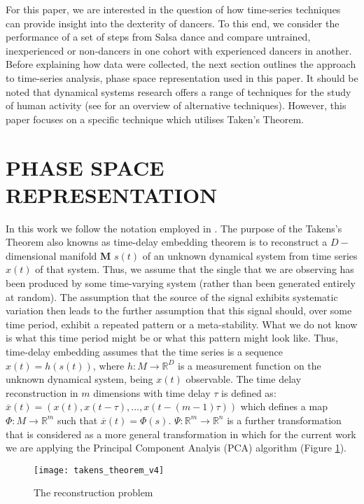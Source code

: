\documentclass{sigchi}
\begin{document}
For this paper, we are interested in the question of how time-series techniques can provide insight into 
the dexterity of dancers. To this end, we consider the performance of a set of steps from Salsa dance and 
compare untrained, inexperienced or non-dancers in one cohort with experienced dancers in another. 
Before explaining how data were collected, the next section outlines the approach to time-series analysis,
phase space representation used in this paper. 
It should be noted that dynamical systems research offers a range of techniques for the study of human activity 
(see \cite{Guastello2011} for an overview of alternative techniques). 
However, this paper focuses on a specific technique which utilises Taken's Theorem.






\section{PHASE SPACE REPRESENTATION}
In this work we follow the notation employed in \cite{Uzal2011}.
The purpose of the Takens's Theorem also knowns as time-delay embedding theorem 
is to reconstruct a $D-$dimensional manifold \textbf{M} $s(t)$ of an unknown dynamical 
system from time series $x(t)$ of that system.
Thus, we assume that the single that we are observing has been produced by some time-varying system 
(rather than been generated entirely at random).  
The assumption that the source of the signal exhibits systematic variation then leads to the further 
assumption that this signal should, over some time period, exhibit a repeated pattern or a meta-stability.  
What we do not know is what this time period might be or what this pattern might look like.  
Thus, time-delay embedding assumes that the time series is a sequence $x(t)=h(s(t))$, 
where $h: M \rightarrow \mathbb{R}^D$ is a measurement function on the unknown dynamical system, 
being $x(t)$ observable.
The time delay reconstruction in $m$ dimensions with time delay $\tau$ is defined as:
$\overline{x}(t) = (x(t), x(t-\tau),...,x(t-(m-1)\tau))$ which defines a map
$\varPhi: M \rightarrow \mathbb{R}^m$ such that $\overline{x}(t) = \varPhi(s)$.
$\varPsi: \mathbb{R}^m \rightarrow \mathbb{R}^n$ is a further transformation that
is considered as a more general transformation in which for the 
current work we are applying the Principal Component Analyis (PCA) algorithm (Figure \ref{fig:takens_theorem}).
\begin{figure}[!htb]
\centering    
\texttt{[image: takens\_theorem\_v4]}
\caption[PA]{The reconstruction problem}
\label{fig:takens_theorem}
\end{figure}
\end{document}
